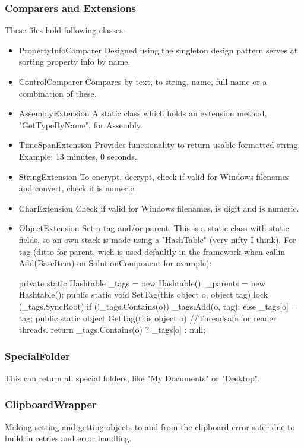 \subsubsection{Comparers and Extensions}
These files hold following classes:
\begin{itemize}
\item PropertyInfoComparer
\npar
Designed using the singleton design pattern serves at sorting property info by name.
\item ControlComparer
\npar
Compares by text, to string, name, full name or a combination of these. 
\item AssemblyExtension
\npar
A static class which holds an extension method, "GetTypeByName", for Assembly.
\item TimeSpanExtension
\npar
Provides functionality to return usable formatted string.  Example: 13 minutes, 0 seconds.
\item StringExtension
\npar
To encrypt, decrypt, check if valid for Windows filenames and convert, check if is numeric.
\item CharExtension
\npar
Check if valid for Windows filenames, is digit and is numeric.
\item ObjectExtension
\npar
Set a tag and/or parent. This is a static class with static fields, so an own stack is made using a "HashTable" (very nifty I think). For tag (ditto for parent, wich is used defaultly in the framework when callin Add(BaseItem) on SolutionComponent for example):
\begin{codelisting}
private static Hashtable _tags = new Hashtable(), _parents = new Hashtable();
public static void SetTag(this object o, object tag)
{
    lock (_tags.SyncRoot)
        if (!_tags.Contains(o))
            _tags.Add(o, tag);
        else
            _tags[o] = tag;
}
public static object GetTag(this object o)
{
    //Threadsafe for reader threads.
    return _tags.Contains(o) ? _tags[o] : null;
}
\end{codelisting}
\end{itemize}

\subsubsection{SpecialFolder}
This can return all special folders, like "My Documents" or "Desktop".

\subsubsection{ClipboardWrapper}
Making setting and getting objects to and from the clipboard error safer due to build in retries and error handling.

